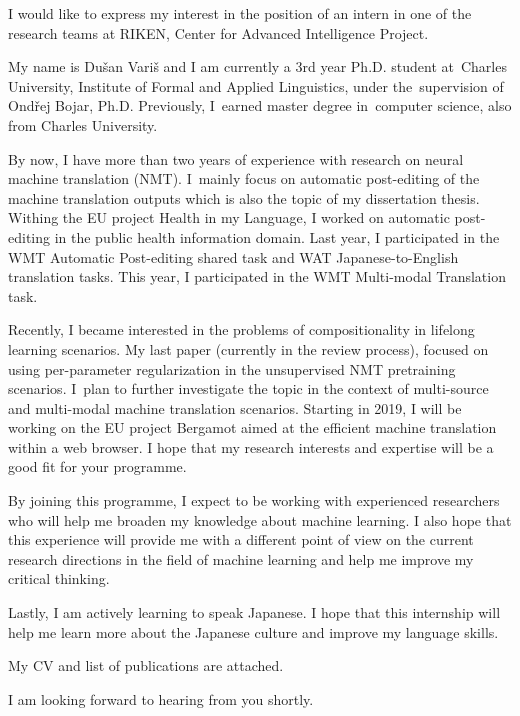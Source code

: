 \documentclass[11pt,a4paper,times]{moderncv} %
\begin{document}
\makelettertitle %

I would like to express my interest in the position of an intern in one of the research teams at RIKEN, Center for Advanced Intelligence Project.

My name is Du\v{s}an Vari\v{s} and I am currently a 3rd year Ph.D. student at~Charles University, Institute of Formal and Applied Linguistics, under the~supervision of Ond\v{r}ej Bojar, Ph.D. Previously, I~earned master degree in~computer science, also from Charles University.

By now, I have more than two years of experience with research on neural machine translation (NMT).
I~mainly focus on automatic post-editing of the machine translation outputs which is also the topic of my dissertation thesis.
Withing the EU project Health in my Language, I worked on automatic post-editing in the public health information domain.
Last year, I participated in the WMT Automatic Post-editing shared task and WAT Japanese-to-English translation tasks.
This year, I participated in the WMT Multi-modal Translation task.

Recently, I became interested in the problems of compositionality in lifelong learning scenarios.
My last paper (currently in the review process), focused on using per-parameter regularization in the unsupervised NMT pretraining scenarios.
I~plan to further investigate the topic in the context of multi-source and multi-modal machine translation scenarios.
Starting in 2019, I will be working on the EU project Bergamot aimed at the efficient machine translation within a web browser.
I hope that my research interests and expertise will be a good fit for your programme.

By joining this programme, I expect to be working with experienced researchers who will help me broaden my knowledge about machine learning.
I also hope that this experience will provide me with a different point of view on the current research directions in the field of machine learning and help me improve my critical thinking.

Lastly, I am actively learning to speak Japanese.
I hope that this internship will help me learn more about the Japanese culture and improve my language skills.

My CV and list of publications are attached.

I am looking forward to hearing from you shortly.


\makeletterclosing %

\end{document}
